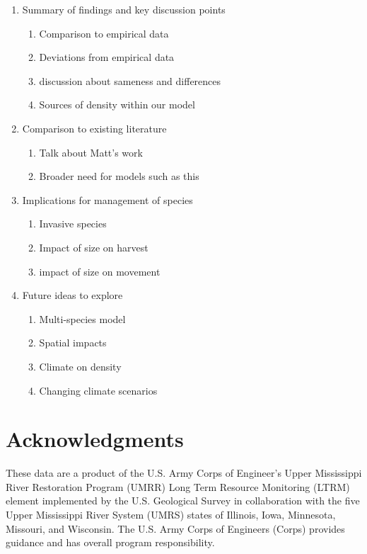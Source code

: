 \documentclass[preprint,review,12pt,authoryear]{elsarticle}
\begin{document}
\begin{enumerate}
\item Summary of findings and key discussion points
  \begin{enumerate}
  \item Comparison to empirical data
  \item Deviations from empirical data
  \item discussion about sameness and differences
  \item Sources of density within our model
  \end{enumerate}
\item Comparison to existing literature
  \begin{enumerate}
  \item Talk about Matt's work \citep{catalano2010size,
      catalano2011whole}
  \item Broader need for models such as this
  \end{enumerate}
\item Implications for management of species
  \begin{enumerate}
  \item Invasive species
  \item Impact of size on harvest
  \item impact of size on movement
  \end{enumerate}
\item Future ideas to explore
  \begin{enumerate}
  \item Multi-species model
  \item Spatial impacts
  \item Climate on density
  \item Changing climate scenarios
  \end{enumerate}
\end{enumerate}

\section{Acknowledgments}

These data are a product of the U.S. Army Corps of Engineer's Upper Mississippi 
River Restoration Program (UMRR) Long Term Resource Monitoring (LTRM) element 
implemented by the U.S. Geological Survey in collaboration with the five 
Upper Mississippi River System (UMRS) states of Illinois, Iowa, Minnesota, 
Missouri, and Wisconsin.
The U.S. Army Corps of Engineers (Corps) 
provides guidance and has overall program responsibility.
\end{document}
